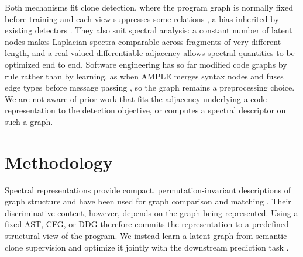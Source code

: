 \documentclass[final,5p,times,twocolumn]{elsarticle}
\newcommand{\added}[1]{{\color{green!50!black}#1}}
\theoremstyle{plain}
\begin{document}
\added{Both mechanisms fit clone detection, where the program graph is normally
fixed before training and each view suppresses some relations
\cite{yamaguchi2014cpg}, a bias inherited by existing detectors
\cite{wang2020faast,yu2023graphsemantics,zhang2024fsdclcd}. They also suit
spectral analysis: a constant number of latent nodes makes Laplacian spectra
comparable across fragments of very different length, and a real-valued
differentiable adjacency allows spectral quantities to be optimized end to end.
Software engineering has so far modified code graphs by rule rather than by
learning, as when AMPLE merges syntax nodes and fuses edge types before message
passing \cite{wen2023ample}, so the graph remains a preprocessing choice. We are
not aware of prior work that fits the adjacency underlying a code representation
to the detection objective, or computes a spectral descriptor on such a graph.}




\section{Methodology}
\label{sec:revised_methodology}

Spectral representations provide compact, permutation-invariant descriptions of graph structure and have been used for graph comparison and matching \cite{wilson2008study}. Their discriminative content, however, depends on the graph being represented. Using a fixed AST, CFG, or DDG therefore commits the representation to a predefined structural view of the program. We instead learn a latent graph from semantic-clone supervision and optimize it jointly with the downstream prediction task \cite{yu2021deep}.
\end{document}
